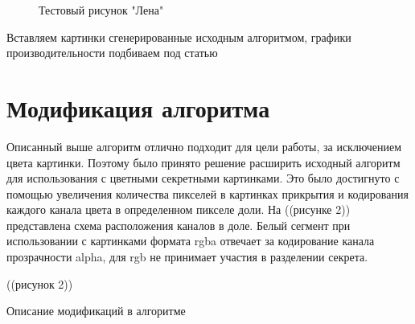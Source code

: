 \documentclass[a4paper,article,14pt]{extarticle}
\begin{document}
\begin{figure}[h]
    \caption{Тестовый рисунок "Лена"}
    \label{fig:image}
\end{figure}

Вставляем картинки сгенерированные исходным алгоритмом, графики производительности подбиваем под статью


\section{Модификация алгоритма}

Описанный выше алгоритм отлично подходит для цели работы, за исключением цвета картинки. Поэтому
было принято решение расширить исходный алгоритм для использования с цветными секретными картинками. 
Это было достигнуто с помощью увеличения количества пикселей в картинках прикрытия и кодирования каждого канала цвета 
в определенном пикселе доли. На ((рисунке 2)) представлена схема расположения каналов в доле.
Белый сегмент при использовании с картинками формата rgba отвечает за кодирование канала прозрачности alpha,
для rgb не принимает участия в разделении секрета.

((рисунок 2))
 
Описание модификаций в алгоритме
\end{document}
